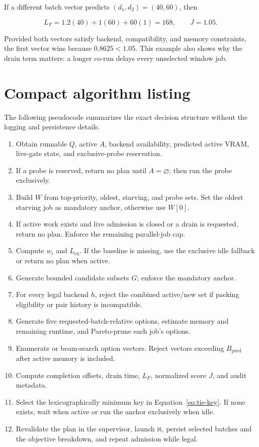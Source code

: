 \documentclass[11pt]{article}
\begin{document}
If a different batch vector predicts $(d_1,d_2)=(40,60)$, then

\begin{equation}
  L_F=1.2(40)+1(60)+60(1)=168,
  \qquad J=1.05.
\end{equation}

Provided both vectors satisfy backend, compatibility, and memory constraints,
the first vector wins because $0.8625<1.05$.  This example also shows why the
drain term matters: a longer co-run delays every unselected window job.

\section{Compact algorithm listing}

The following pseudocode summarizes the exact decision structure without the
logging and persistence details.

\begin{enumerate}[label=\textbf{\arabic*.},leftmargin=*]
  \item Obtain runnable $Q$, active $A$, backend availability, predicted active
        VRAM, live-gate state, and exclusive-probe reservation.
  \item If a probe is reserved, return no plan until $A=\varnothing$; then run
        the probe exclusively.
  \item Build $W$ from top-priority, oldest, starving, and probe sets.  Set the
        oldest starving job as mandatory anchor, otherwise use $W[0]$.
  \item If active work exists and live admission is closed or a drain is
        requested, return no plan.  Enforce the remaining parallel-job cap.
  \item Compute $w_i$ and $L_{\mathrm{ex}}$.  If the baseline is missing, use
        the exclusive idle fallback or return no plan when active.
  \item Generate bounded candidate subsets $G$; enforce the mandatory anchor.
  \item For every legal backend $h$, reject the combined active/new set if
        packing eligibility or pair history is incompatible.
  \item Generate five requested-batch-relative options, estimate memory and
        remaining runtime, and Pareto-prune each job's options.
  \item Enumerate or beam-search option vectors.  Reject vectors exceeding
        $B_{\mathrm{pred}}$ after active memory is included.
  \item Compute completion offsets, drain time, $L_F$, normalized score $J$, and
        audit metadata.
  \item Select the lexicographically minimum key in
        Equation~\eqref{eq:tie-key}.  If none exists, wait when active or run the
        anchor exclusively when idle.
  \item Revalidate the plan in the supervisor, launch it, persist selected
        batches and the objective breakdown, and repeat admission while legal.
\end{enumerate}
\end{document}
